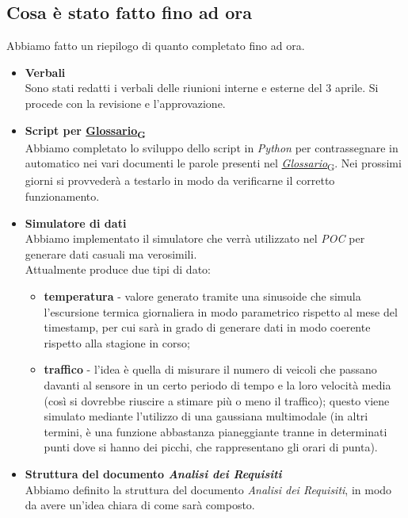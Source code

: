 \documentclass[italian,12pt]{article}
\begin{document}
\subsection{Cosa è stato fatto fino ad ora}
Abbiamo fatto un riepilogo di quanto completato fino ad ora.
\begin{itemize}
	\item \textbf{Verbali} \\
	Sono stati redatti i verbali delle riunioni interne e esterne del 3 aprile. Si procede con la revisione e l'approvazione.
	\item \textbf{Script per \href{https://7last.github.io/docs/rtb/documentazione-interna/glossario#glossario}{Glossario\textsubscript{G}}} \\
	Abbiamo completato lo sviluppo dello script in \textit{Python} per contrassegnare in automatico nei vari documenti le parole presenti nel \href{https://7last.github.io/docs/rtb/documentazione-interna/glossario#glossario}{\textit{Glossario}\textsubscript{G}}. Nei prossimi giorni si provvederà a testarlo in modo da verificarne il corretto funzionamento.
	\item \textbf{Simulatore di dati} \\
	Abbiamo implementato il simulatore che verrà utilizzato nel \textit{POC} per generare dati casuali ma verosimili. \\
	Attualmente produce due tipi di dato:
	\begin{itemize}
		\item \textbf{temperatura} - valore generato tramite una sinusoide che simula l'escursione termica giornaliera in modo parametrico rispetto al mese del timestamp, per cui sarà in grado di generare dati in modo coerente rispetto alla stagione in corso;
		\item \textbf{traffico} - l'idea è quella di misurare il numero di veicoli che passano davanti al sensore in un certo periodo di tempo e la loro velocità media (così si dovrebbe riuscire a stimare più o meno il traffico); questo viene simulato mediante l'utilizzo di una gaussiana multimodale (in altri termini, è una funzione abbastanza pianeggiante tranne in determinati punti dove si hanno dei picchi, che rappresentano gli orari di punta).
	\end{itemize}
	\item \textbf{Struttura del documento \textit{Analisi dei Requisiti}} \\
	Abbiamo definito la struttura del documento \textit{Analisi dei Requisiti}, in modo da avere un'idea chiara di come sarà composto.

\end{itemize}
\end{document}
